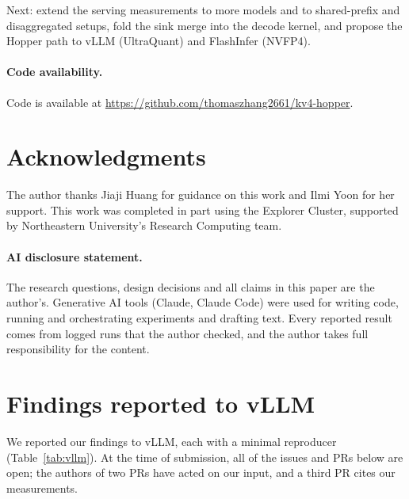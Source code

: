 \documentclass[11pt]{article}
\begin{document}
Next: extend the serving measurements to more models and to shared-prefix and disaggregated setups, fold the sink merge into the decode kernel, and propose the Hopper path to vLLM (UltraQuant) and FlashInfer (NVFP4).

\paragraph{Code availability.} Code is available at \url{https://github.com/thomaszhang2661/kv4-hopper}.

\section*{Acknowledgments}
The author thanks Jiaji Huang for guidance on this work and Ilmi Yoon for her support. This work was completed in part using the Explorer Cluster, supported by Northeastern University's Research Computing team.

\paragraph{AI disclosure statement.} The research questions, design decisions and all claims in this paper are the author's. Generative AI tools (Claude, Claude Code) were used for writing code, running and orchestrating experiments and drafting text. Every reported result comes from logged runs that the author checked, and the author takes full responsibility for the content.

\FloatBarrier
\appendix
\section{Findings reported to vLLM}
\label{sec:vllm}

We reported our findings to vLLM, each with a minimal reproducer (Table~\ref{tab:vllm}). At the time of submission, all of the issues and PRs below are open; the authors of two PRs have acted on our input, and a third PR cites our measurements.
\end{document}
